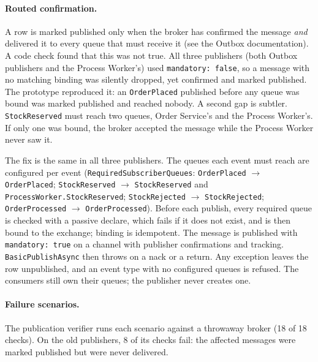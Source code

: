 \documentclass[a4paper]{report}
\begin{document}
\paragraph{Routed confirmation.} A row is marked published only when the
broker has confirmed the message \emph{and} delivered it to every queue that
must receive it (see the Outbox documentation). A code check found that
this was not true. All three publishers (both Outbox publishers and the Process
Worker's) used \texttt{mandatory: false}, so a message with no matching
binding was silently dropped, yet confirmed and marked published. The
prototype reproduced it: an \texttt{OrderPlaced} published before any queue
was bound was marked published and reached nobody. A second gap is subtler.
\texttt{StockReserved} must reach two queues, Order Service's and the Process
Worker's. If only one was bound, the broker accepted the message while the
Process Worker never saw it.

The fix is the same in all three publishers. The queues each event must
reach are configured per event (\texttt{RequiredSubscriberQueues}:
\texttt{OrderPlaced} $\to$ \texttt{OrderPlaced}; \texttt{StockReserved}
$\to$ \texttt{StockReserved} and \texttt{ProcessWorker.StockReserved};
\texttt{StockRejected} $\to$ \texttt{StockRejected}; \texttt{OrderProcessed}
$\to$ \texttt{OrderProcessed}). Before each publish, every required queue is
checked with a passive declare, which fails if it does not exist, and is then
bound to the exchange; binding is idempotent. The message is published with
\texttt{mandatory: true} on a channel with publisher confirmations and
tracking. \texttt{BasicPublishAsync} then throws on a nack or a return. Any
exception leaves the row unpublished, and an event type with no configured
queues is refused. The consumers still own their queues; the publisher never
creates one.

\paragraph{Failure scenarios.} The publication verifier runs each scenario
against a throwaway broker (18 of 18 checks).
On the old publishers, 8 of its checks fail: the affected messages were
marked published but were never delivered.
\end{document}
